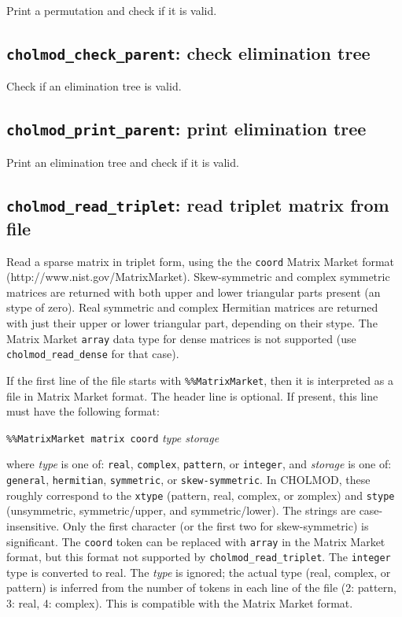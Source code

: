 \documentclass[11pt]{article}
\begin{document}

Print a permutation and check if it is valid.

\newpage \subsection{{\tt cholmod\_check\_parent}: check elimination tree}


Check if an elimination tree is valid.

\subsection{{\tt cholmod\_print\_parent}: print elimination tree}


Print an elimination tree and check if it is valid.

\newpage \subsection{{\tt cholmod\_read\_triplet}: read triplet matrix from file}


Read a sparse matrix in triplet form, using the the {\tt coord} 
Matrix Market format (http://www.nist.gov/MatrixMarket).
Skew-symmetric and complex symmetric matrices are returned with
both upper and lower triangular parts present (an stype of zero).
Real symmetric and complex Hermitian matrices are returned with just
their upper or lower triangular part, depending on their stype.
The Matrix Market {\tt array} data type for dense matrices is not supported
(use {\tt cholmod\_read\_dense} for that case).

If the first line of the file starts with {\tt \%\%MatrixMarket}, then it is
interpreted as a file in Matrix Market format.  The header line is optional.
If present, this line must have the following format:
\vspace{0.1in}

        {\tt \%\%MatrixMarket matrix coord} {\em type storage}

\vspace{0.1in}
\noindent
where {\em type} is one of: {\tt real}, {\tt complex}, {\tt pattern},
or {\tt integer}, and {\em storage} is one of: {\tt general}, {\tt hermitian},
{\tt symmetric}, or {\tt skew-symmetric}.
In CHOLMOD, these roughly correspond to the {\tt xtype}
(pattern, real, complex, or zomplex) and {\tt stype}
(unsymmetric, symmetric/upper, and symmetric/lower).
The strings are case-insensitive.  Only the first character (or the
first two for skew-symmetric) is significant.
The {\tt coord} token can be replaced with {\tt array} in the Matrix Market format, but
this format not supported by {\tt cholmod\_read\_triplet}.
The {\tt integer} type is converted to real.
The {\em type} is ignored; the actual type (real, complex, or pattern) is
inferred from the number of tokens in each line of the file (2: pattern,
3: real, 4: complex).  This is compatible with the Matrix Market format.
\end{document}
